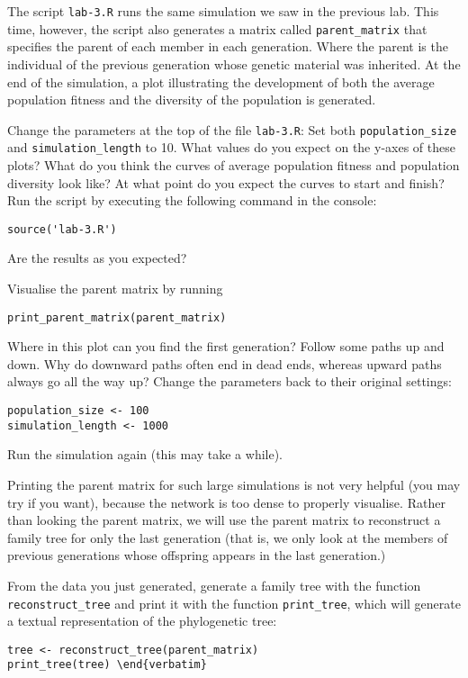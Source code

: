 \documentclass[a4paper, 9pt]{article}
\begin{document}
The script \texttt{lab-3.R} runs the same simulation we saw in the
previous lab. This time, however, the script also generates a matrix
called \texttt{parent\_matrix} that specifies the parent of each member
in each generation. Where the parent is the individual of the previous
generation whose genetic material was inherited. At the end of the
simulation, a plot illustrating the development of both the average
population fitness and the diversity of the population is generated.

\begin{exercise}
\action Change the parameters at the top of the file \verb|lab-3.R|: Set both \texttt{population\_size} and \texttt{simulation\_length} to 10. 
\ask What values do you expect on the y-axes of these plots? 
\ask What do you think the curves of average population fitness and population diversity look like? 
\ask At what point do you expect the curves to start and finish?
\action Run the script by executing the following command in the console: 
\begin{lstlisting}
source('lab-3.R')
\end{lstlisting}
Are the results as you expected?

\action Visualise the parent matrix by running
\begin{lstlisting}
print_parent_matrix(parent_matrix)
\end{lstlisting}
\ask Where in this plot can you find the first generation?
\askstar Follow some paths up and down. Why do downward paths often end in dead ends, whereas upward paths always go all the way up?
\action Change the parameters back to their original settings:\begin{lstlisting}
population_size <- 100
simulation_length <- 1000
\end{lstlisting}
\action Run the simulation again (this may take a while).
\end{exercise}

Printing the parent matrix for such large simulations is not very
helpful (you may try if you want), because the network is too dense to
properly visualise. Rather than looking the parent matrix, we will use
the parent matrix to reconstruct a family tree for only the last
generation (that is, we only look at the members of previous generations
whose offspring appears in the last generation.)

\begin{exercise}
\action From the data you just generated, generate a family tree with the function \verb|reconstruct_tree| and print it with the function \verb|print_tree|, which will generate a textual representation of the phylogenetic tree:
\begin{lstlisting}
tree <- reconstruct_tree(parent_matrix)
print_tree(tree) \end{verbatim}
\end{lstlisting}
\end{exercise}
\end{document}
